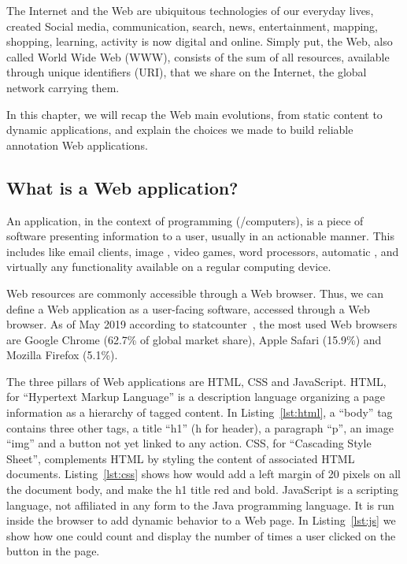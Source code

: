 The Internet and the Web are ubiquitous technologies of our everyday lives,
created 
Social media, communication, search, news, entertainment, mapping,
shopping, learning,  activity is now digital and online.
Simply put, the Web, also called World Wide Web (WWW), consists of the sum of all resources,
available through unique identifiers (URI), that we share on the Internet,
the global network carrying them.

In this chapter, we will recap the Web main evolutions,
from static content to dynamic applications,
and explain the choices we made to build reliable annotation Web applications.

\subsection{What is a Web application?}%
\label{sub:web_application}

An application, in the context of programming (/computers),
is a piece of software presenting information to a user,
usually in an actionable manner.
This includes  like email clients, image , video games,
word processors, automatic , and virtually any functionality
available on a regular computing device.

Web resources are commonly accessible through a Web browser.
Thus, we can define a Web application as a user-facing software,
accessed through a Web browser.
As of May 2019 according to statcounter~\cite{browser-market-share},
the most used Web browsers are Google Chrome (62.7\% of global market share),
Apple Safari (15.9\%) and Mozilla Firefox (5.1\%).

The three pillars of Web applications are HTML, CSS and JavaScript.
HTML, for ``Hypertext Markup Language'' is a description language
organizing a page information as a hierarchy of tagged content.
In Listing~\ref{lst:html}, a ``body'' tag contains three other tags,
a title ``h1'' (h for header), a paragraph ``p'', an image ``img''
and a button not yet linked to any action.
CSS, for ``Cascading Style Sheet'', complements HTML by styling
the content of associated HTML documents.
Listing~\ref{lst:css} shows how  would add a left margin of 20 pixels
on all the document body, and make the h1 title red and bold.
JavaScript is a scripting language, not affiliated in any form
to the Java programming language.
It is run inside the browser to add dynamic behavior to a Web page.
In Listing~\ref{lst:js} we show how one could count and display
the number of times a user clicked on the button in the page.

